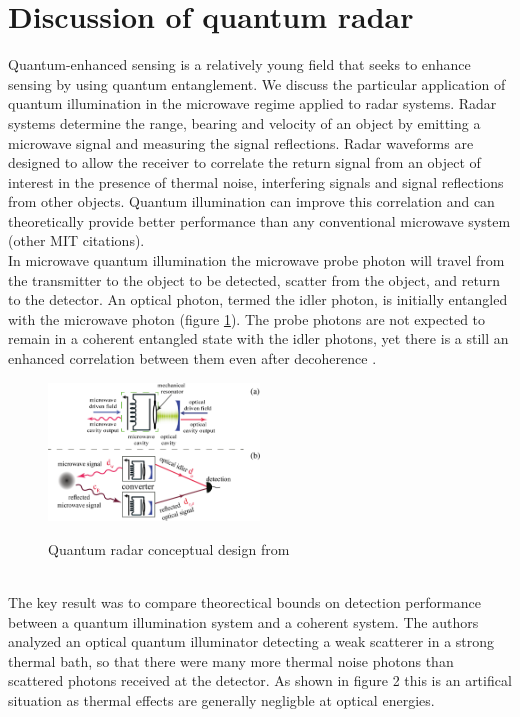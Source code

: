 \documentclass[a4paper,11pt, twocolumn]{article}
\numberwithin{equation}{section}
\begin{document}
\section{Discussion of quantum radar}
Quantum-enhanced sensing is a relatively young field that seeks to enhance sensing by using quantum entanglement. 
We discuss the particular application of quantum illumination in the microwave regime applied to radar systems.
Radar systems determine the range, bearing and velocity of an object by emitting a microwave signal and measuring the signal reflections.
Radar waveforms are designed to allow the receiver to correlate the return signal from an object of interest in the presence of thermal noise, interfering signals and signal reflections from other objects.
Quantum illumination can improve this correlation and can theoretically provide better performance than any conventional microwave system \cite{qi}(other MIT citations).
\\
In microwave quantum illumination the microwave probe photon will travel from the transmitter to the object to be detected, scatter from the object, and return to the detector.
An optical photon, termed the idler photon, is initially entangled with the microwave photon (figure \ref{fig:quantumradar}).
The probe photons are not expected to remain in a coherent entangled state with the idler photons, yet there is a still an enhanced correlation between them even after decoherence \cite{qig}. 
\begin{figure}[ht]
 \caption{Quantum radar conceptual design from \cite{qi}}
 \centering
   \includegraphics[width=0.5\textwidth]{figs/QuantumRadar}
 \label{fig:quantumradar}
\end{figure}
\\
The key result \cite{qig} was to compare theorectical bounds on detection performance between a quantum illumination system and a coherent system.
The authors analyzed an optical quantum illuminator detecting a weak scatterer in a strong thermal bath, so that there were many more thermal noise photons than scattered photons received at the detector. 
As shown in figure 2 this is an artifical situation as thermal effects are generally negligble at optical energies.
\end{document}
